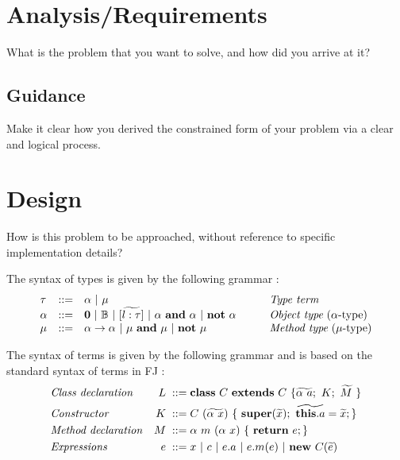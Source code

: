 \documentclass{l4proj}
\begin{document}
\chapter{Analysis/Requirements}
What is the problem that you want to solve, and how did you arrive at it?
\section{Guidance}
Make it clear how you derived the constrained form of your problem via a clear and logical process.

\chapter{Design}
How is this problem to be approached, without reference to specific implementation details?


\label{sec:design}
The syntax of types is given by the following grammar \citep{Dardha2013,Dardha2017}:
$$
    \begin{array}{llll}
        \tau   & ::=                                       & \alpha \ |\ \mu
               & \mbox{{\em Type term}}
        \\
        \alpha & ::=                                       & \zero \ |\ \btypes \ |\ [\wt{l:\tau}] \ |\ \alpha \ \bf{and}\ \alpha \ |\ \bf{not}\ \alpha
        \qquad
               & \mbox{{\em Object type} ($\alpha $-type)}
        \\
        \mu    & ::=                                       & \alpha \to \alpha \ |\ \mu \ \bf{and}\ \mu \ |\ \bf{not}\ \mu
               & \mbox{{\em Method type} ($\mu $-type)}
    \end{array}
$$

The syntax of terms is given by the following grammar and is based on the standard syntax of terms in FJ \cite{Igarashi1999,Dardha2013,Dardha2017}:
\begin{align*}
     & \mbox{\textit{Class declaration}}  & L \; ::= \; & \syndecl{C}{C}{\wt{\alpha \ a};\ K; \ \wt{M}\ }                         \\
     & \mbox{\textit{Constructor}}        & K \;::=\;   & C\ (\wt{\alpha\ x})\ \{\ \synsuper(\wt{x});\ \wt{\synthis.a}=\wt{x}; \} \\
     & \mbox{\textit{Method declaration}} & M \; ::= \; & \alpha \ m\ (\alpha \ x)\ \{\ \synret e; \}                             \\
     & \mbox{\textit{Expressions}}        & e \; ::=\;  & x\ |\  c\ |\ e.a\ |\ e.m(e) \ | \ \synnew C(\wt{e})
\end{align*}
\end{document}
